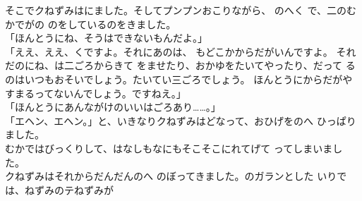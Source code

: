 \documentclass[
    a4paper,
    10pt,
    book]
    {tarticle}
\begin{document}
\newpage
\thispagestyle{fancy}
\indent そこでクねずみはにました。そしてプンプンおこりながら、
のへく
で、二のむかでがの
のをしているのをきました。\\
「ほんとうにね、そうはできないもんだよ。」\\
「ええ、ええ、くですよ。それにあのは、
もどこかからだがいんですよ。
それだのにね、は二ごろからきて
をませたり、おかゆをたいてやったり、だって
るのはいつもおそいでしょう。たいてい三ごろでしょう。
ほんとうにからだがやすまるってないんでしょう。ですねえ。」\\
「ほんとうにあんながけのいいはごろあり……。」\\
「エヘン、エヘン。」と、いきなりクねずみはどなって、おひげをのへ
ひっぱりました。\\
\indent むかではびっくりして、はなしもなにもそこそこにれてげて
ってしまいました。\\
\indent クねずみはそれからだんだんのへ
のぼってきました。のガランとした
いりでは、ねずみのテねずみが
\end{document}
